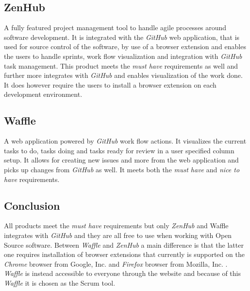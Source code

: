 \subsection*{ZenHub}
A fully featured project management tool to handle agile processes around software development. 
It is integrated with the \textit{GitHub} web application, that is used for source control of the software, by use of a browser extension and enables the users to handle sprints, work flow visualization and integration with \textit{GitHub} task management. 
This product meets the \textit{must have} requirements as well and further more integrates with \textit{GitHub} and enables visualization of the work done.
It does however require the users to install a browser extension on each development environment.

\subsection*{Waffle}
A web application powered by \textit{GitHub} work flow actions. 
It visualizes the current tasks to do, tasks doing and tasks ready for review in a user specified column setup. 
It allows for creating new issues and more from the web application and picks up changes from \textit{GitHub} as well. 
It meets both the \textit{must have} and \textit{nice to have} requirements.

\subsection*{Conclusion}
All products meet the \textit{must have} requirements but only \textit{ZenHub} and Waffle integrates with \textit{GitHub} and they are all free to use when working with Open Source software.
Between \textit{Waffle} and \textit{ZenHub} a main difference is that the latter one requires installation of browser extensions that currently is supported on the \textit{Chrome} browser from Google, Inc. and \textit{Firefox} browser from Mozilla, Inc.  \citep{preStudy:scrum:zenhub}.
\textit{Waffle} is instead accessible to everyone through the website and because of this \textit{Waffle} it is chosen as the Scrum tool.
